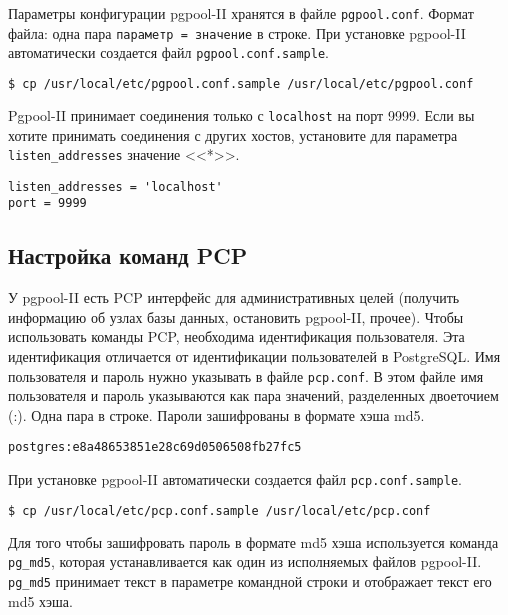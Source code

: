 Параметры конфигурации pgpool-II хранятся в файле \lstinline!pgpool.conf!. Формат файла: одна пара \lstinline!параметр = значение! в строке. При установке pgpool-II автоматически создается файл \lstinline!pgpool.conf.sample!.

\begin{lstlisting}[language=Bash,label=lst:pgpool4,caption=Файлы конфигурации]
$ cp /usr/local/etc/pgpool.conf.sample /usr/local/etc/pgpool.conf
\end{lstlisting}

Pgpool-II принимает соединения только с \lstinline!localhost! на порт 9999. Если вы хотите принимать соединения с других хостов, установите для параметра \lstinline!listen_addresses! значение <<*>>.

\begin{lstlisting}[label=lst:pgpool5,caption=Файлы конфигурации]
listen_addresses = 'localhost'
port = 9999
\end{lstlisting}




\subsection{Настройка команд PCP}

У pgpool-II есть PCP интерфейс для административных целей (получить информацию об узлах базы данных, остановить pgpool-II, прочее). Чтобы использовать команды PCP, необходима идентификация пользователя. Эта идентификация отличается от идентификации пользователей в PostgreSQL. Имя пользователя и пароль нужно указывать в файле \lstinline!pcp.conf!. В этом файле имя пользователя и пароль указываются как пара значений, разделенных двоеточием (:). Одна пара в строке. Пароли зашифрованы в формате хэша md5.

\begin{lstlisting}[label=lst:pgpool6,caption=Настройка команд PCP]
postgres:e8a48653851e28c69d0506508fb27fc5
\end{lstlisting}

При установке pgpool-II автоматически создается файл \lstinline!pcp.conf.sample!.

\begin{lstlisting}[language=Bash,label=lst:pgpool7,caption=Настройка команд PCP]
$ cp /usr/local/etc/pcp.conf.sample /usr/local/etc/pcp.conf
\end{lstlisting}

Для того чтобы зашифровать пароль в формате md5 хэша используется команда \lstinline!pg_md5!, которая устанавливается как один из исполняемых файлов pgpool-II. \lstinline!pg_md5! принимает текст в параметре командной строки и отображает текст его md5 хэша.

